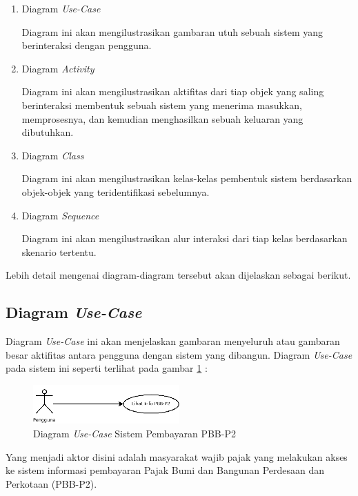 \documentclass[pdftex,12pt, oneside]{article}
\begin{document}
\begin{enumerate}
  \item Diagram \textit{Use-Case}
  
  Diagram ini akan mengilustrasikan gambaran utuh sebuah sistem yang berinteraksi dengan pengguna.
  
  \item Diagram \textit{Activity}
  
  Diagram ini akan mengilustrasikan aktifitas dari tiap objek yang saling berinteraksi membentuk sebuah sistem yang menerima masukkan, memprosesnya, dan kemudian menghasilkan sebuah keluaran yang dibutuhkan.
  
  \item Diagram \textit{Class}
  
  Diagram ini akan mengilustrasikan kelas-kelas pembentuk sistem berdasarkan objek-objek yang teridentifikasi sebelumnya.
  
  \item Diagram \textit{Sequence}
  
  Diagram ini akan mengilustrasikan alur interaksi dari tiap kelas berdasarkan skenario tertentu.
  
\end{enumerate}

Lebih detail mengenai diagram-diagram tersebut akan dijelaskan sebagai berikut.

\subsection{Diagram \textit{Use-Case}}

Diagram \textit{Use-Case} ini akan menjelaskan gambaran menyeluruh atau gambaran besar aktifitas antara pengguna dengan sistem yang dibangun. Diagram \textit{Use-Case} pada sistem ini seperti terlihat pada gambar \ref{fig:uml-use-case} :

\begin{figure}[H]
  \centering
  \includegraphics[width=0.5\textwidth]{./resources/use-case-diag}
  \caption{Diagram \textit{Use-Case} Sistem Pembayaran PBB-P2}
  \label{fig:uml-use-case}
\end{figure}

Yang menjadi aktor disini adalah masyarakat wajib pajak yang melakukan akses ke sistem informasi pembayaran Pajak Bumi dan Bangunan Perdesaan dan Perkotaan (PBB-P2).
\end{document}
